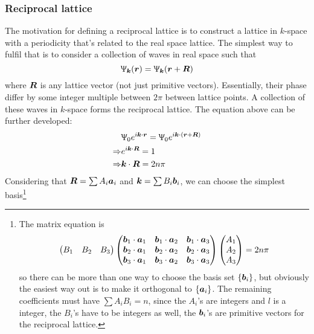 \subsubsection{Reciprocal lattice}
The motivation for defining a reciprocal lattice is to construct a lattice in $k$-space with a periodicity that's related to the real space lattice. The simplest way to fulfil that is to consider a collection of waves in real space such that
\begin{equation}
	\Uppsi_{\boldsymbol{k}}(\boldsymbol{r})=\Uppsi_{\boldsymbol{k}}(\boldsymbol{r}+\boldsymbol{R})
\end{equation}
where $\boldsymbol{R}$ is any lattice vector (not just primitive vectors). Essentially, their phase differ by some integer multiple between $2\pi$ between lattice points. A collection of these waves in $k$-space forms the reciprocal lattice. The equation above can be further developed:
\begin{equation}
\begin{aligned}
	&\Uppsi_0e^{i\boldsymbol{k}\cdot\boldsymbol{r}}=\Uppsi_0e^{i\boldsymbol{k}\cdot(\boldsymbol{r}+\boldsymbol{R})}\\
	\Rightarrow& e^{i\boldsymbol{k}\cdot\boldsymbol{R}}=1\\
	\Rightarrow& \boldsymbol{k}\cdot\boldsymbol{R}=2n\pi
\end{aligned}
\end{equation}
Considering that $\boldsymbol{R}=\sum A_i\boldsymbol{a}_i$ and $\boldsymbol{k}=\sum B_i\boldsymbol{b}_i$, we can choose the simplest basis\footnote{The matrix equation is 
\begin{equation}
	\begin{pmatrix}
		B_1&B_2&B_3
	\end{pmatrix}
	\begin{pmatrix}
		\boldsymbol{b}_1\cdot\boldsymbol{a}_1 & \boldsymbol{b}_1\cdot\boldsymbol{a}_2 & \boldsymbol{b}_1\cdot\boldsymbol{a}_3\\
		\boldsymbol{b}_2\cdot\boldsymbol{a}_1 & \boldsymbol{b}_2\cdot\boldsymbol{a}_2 & \boldsymbol{b}_2\cdot\boldsymbol{a}_3\\
		\boldsymbol{b}_3\cdot\boldsymbol{a}_1 & \boldsymbol{b}_3\cdot\boldsymbol{a}_2 & \boldsymbol{b}_3\cdot\boldsymbol{a}_3		
	\end{pmatrix}
	\begin{pmatrix}
		A_1\\
		A_2\\
		A_3
	\end{pmatrix}=2n\pi
\end{equation}
so there can be more than one way to choose the basis set $\{\boldsymbol{b}_i\}$, but obviously the easiest way out is to make it orthogonal to $\{\boldsymbol{a}_i\}$. The remaining coefficients must have $\sum A_iB_i=n$, since the $A_i$'s are integers and $l$ is a integer, the $B_i$'s have to be integers as well, \ie the $\boldsymbol{b}_i$'s are primitive vectors for the reciprocal lattice.
}
